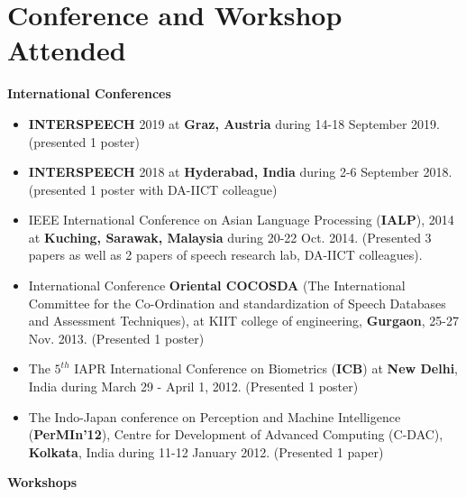 \documentclass[10pt]{article}
\begin{document}
\section*{Conference and Workshop Attended}
\textbf{International Conferences}
\begin{itemize}
\setlength\itemsep{0.15em}
\item \textbf{INTERSPEECH} 2019 at \textbf{Graz, Austria} during 14-18 September 2019. (presented 1 poster) 
\item \textbf{INTERSPEECH} 2018 at \textbf{Hyderabad, India} during 2-6 September 2018. (presented 1 poster with DA-IICT colleague)
\item IEEE International Conference on Asian Language Processing  (\textbf{IALP}), 2014 at \textbf{Kuching, Sarawak, Malaysia} during 20-22 Oct. 2014. (Presented 3 papers as well as 2 papers of speech research lab, DA-IICT colleagues).
\item International Conference  \textbf{Oriental COCOSDA} (The International Committee for the Co-Ordination and standardization of Speech Databases and Assessment Techniques), at KIIT college of engineering, \textbf{Gurgaon}, 25-27 Nov. 2013.  (Presented 1 poster)
\item The $ 5^{th} $  IAPR International Conference on Biometrics (\textbf{ICB}) at \textbf{New Delhi}, India during March 29 - April 1, 2012. (Presented 1 poster)
\item The Indo-Japan conference on Perception and Machine Intelligence (\textbf{PerMIn'12}), Centre for Development of Advanced Computing (C-DAC), \textbf{Kolkata}, India during 11-12 January 2012. (Presented 1 paper)
\end{itemize}
\textbf{Workshops}
\end{document}

